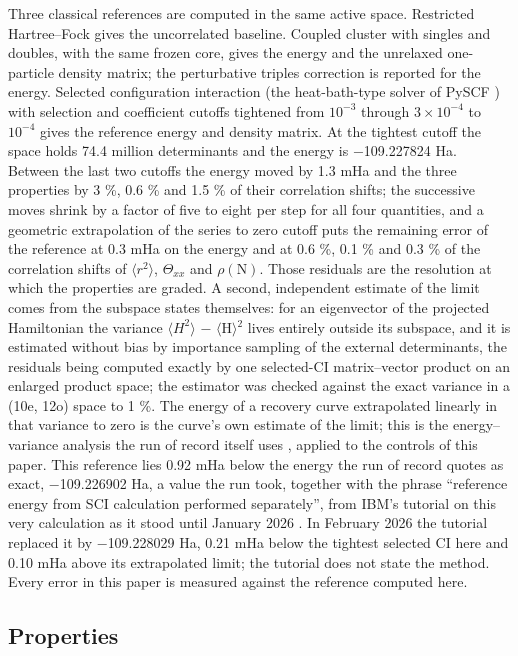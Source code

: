 \documentclass[11pt]{article}
\begin{document}
Three classical references are computed in the same active space. Restricted Hartree--Fock gives the uncorrelated baseline. Coupled cluster with singles and doubles, with the same frozen core, gives the energy and the unrelaxed one-particle density matrix; the perturbative triples correction is reported for the energy. Selected configuration interaction (the heat-bath-type solver of PySCF \cite{PySCF}) with selection and coefficient cutoffs tightened from $10^{-3}$ through $3\times10^{-4}$ to $10^{-4}$ gives the reference energy and density matrix. At the tightest cutoff the space holds 74.4 million determinants and the energy is $-$109.227824 Ha. Between the last two cutoffs the energy moved by 1.3 mHa and the three properties by 3 \%, 0.6 \% and 1.5 \% of their correlation shifts; the successive moves shrink by a factor of five to eight per step for all four quantities, and a geometric extrapolation of the series to zero cutoff puts the remaining error of the reference at 0.3 mHa on the energy and at 0.6 \%, 0.1 \% and 0.3 \% of the correlation shifts of $\langle r^{2}\rangle$, $\Theta_{xx}$ and $\rho(\mathrm{N})$. Those residuals are the resolution at which the properties are graded. A second, independent estimate of the limit comes from the subspace states themselves: for an eigenvector of the projected Hamiltonian the variance $\langle$$H^{2}$$\rangle$ $-$ $\langle$H$\rangle$$^{2}$ lives entirely outside its subspace, and it is estimated without bias by importance sampling of the external determinants, the residuals being computed exactly by one selected-CI matrix--vector product on an enlarged product space; the estimator was checked against the exact variance in a (10e, 12o) space to 1 \%. The energy of a recovery curve extrapolated linearly in that variance to zero is the curve's own estimate of the limit; this is the energy--variance analysis the run of record itself uses \cite{SQD}, applied to the controls of this paper. This reference lies 0.92 mHa below the energy the run of record quotes as exact, $-$109.226902 Ha, a value the run took, together with the phrase ``reference energy from SCI calculation performed separately'', from IBM's tutorial on this very calculation as it stood until January 2026 \cite{IBMtutorial}. In February 2026 the tutorial replaced it by $-$109.228029 Ha, 0.21 mHa below the tightest selected CI here and 0.10 mHa above its extrapolated limit; the tutorial does not state the method. Every error in this paper is measured against the reference computed here.

\subsection{Properties}\label{sec:2.3}
\end{document}
